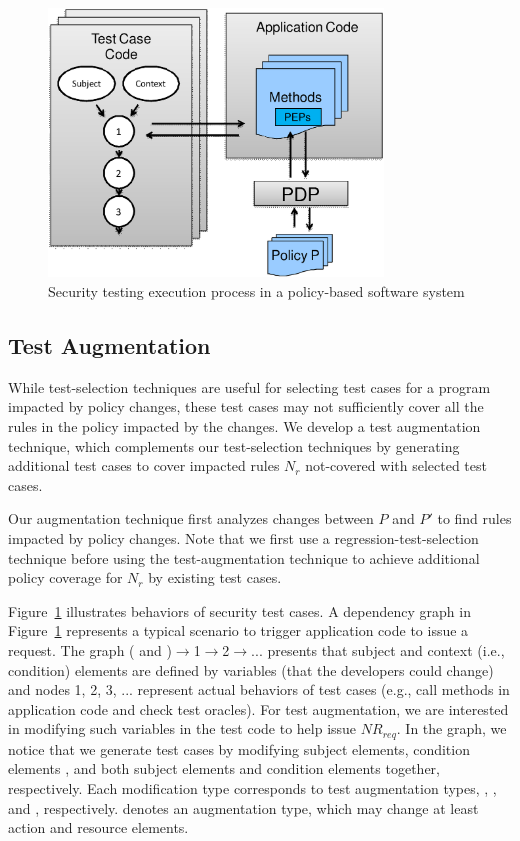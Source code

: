 \begin{figure}[t]
  \centering
     \includegraphics[width=3.5in]{testaugument.eps}
    \vspace{-4pt}
 \caption{\label{fig:testexecution}Security testing execution process in a policy-based software system}
  \vspace{-10pt}
 \vspace{+3pt}
\end{figure}

\subsection{Test Augmentation}
\label{subsec:testaugmentation}
While test-selection techniques are useful for selecting test cases for a program impacted by policy changes, these test cases may not sufficiently cover all the rules in the policy impacted by the changes.
We develop a test augmentation technique, which complements our test-selection techniques by generating additional test cases to 
cover impacted rules $N_r$ not-covered with selected test cases.


Our augmentation technique first analyzes changes between $P$ and $P'$ to find rules impacted by policy changes.
Note that we first use a regression-test-selection technique before using the test-augmentation technique to achieve
additional policy coverage for $N_r$ by existing test cases.

Figure~\ref{fig:testexecution} illustrates behaviors of security test cases.
A dependency graph in Figure~\ref{fig:testexecution} represents a typical
scenario to trigger application code to issue a request.
The graph ( and )$\rightarrow$1$\rightarrow$2$\rightarrow$...
presents that subject and context (i.e., condition) elements are defined by variables (that
the developers could change) and nodes 1, 2, 3, ... represent actual behaviors of test cases (e.g., call methods in application
code and check test oracles).
For test augmentation, we are interested in modifying such variables in the test code
to help issue $NR_{req}$.
In the graph, we notice that we generate test cases by modifying
subject elements, condition elements , and both subject elements and condition elements together, respectively.
Each modification type corresponds to test augmentation types, , , and , respectively.
 denotes an augmentation type, which
may change at least action and resource elements.

